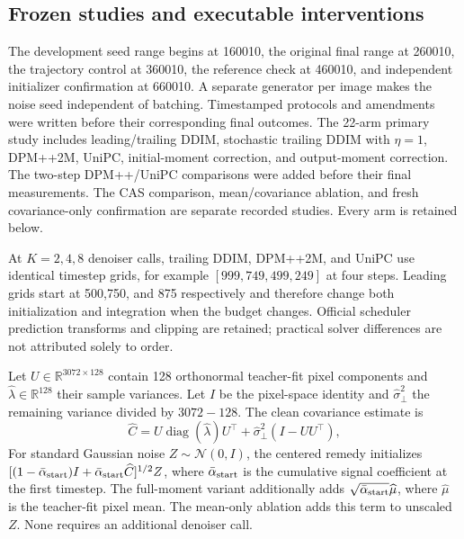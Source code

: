 \subsection{Frozen studies and executable interventions}
The development seed range begins at 160010, the original final range at 260010,
the trajectory control at 360010, the reference check at 460010, and independent
initializer confirmation at 660010. A separate generator per image makes the
noise seed independent of batching. Timestamped protocols and amendments were
written before their corresponding final outcomes. The 22-arm primary study
includes leading/trailing DDIM, stochastic trailing DDIM with $\eta=1$,
DPM++2M, UniPC, initial-moment correction, and output-moment correction.
The two-step DPM++/UniPC comparisons were added before their final measurements.
The CAS comparison, mean/covariance ablation, and fresh covariance-only
confirmation are separate recorded studies. Every arm is retained below.

At $K=2,4,8$ denoiser calls, trailing DDIM, DPM++2M, and UniPC use identical timestep grids,
for example $[999,749,499,249]$ at four steps. Leading grids start at 500,750,
and 875 respectively and therefore change both initialization and integration
when the budget changes. Official scheduler prediction transforms and clipping
are retained; practical solver differences are not attributed solely to order.

Let $U\in\mathbb R^{3072\times128}$ contain 128 orthonormal teacher-fit
pixel components and $\widehat\lambda\in\mathbb R^{128}$ their sample
variances. Let $I$ be the pixel-space identity and
$\widehat\sigma^2_\perp$ the remaining variance divided by $3072-128$.
The clean covariance estimate is
\begin{equation}
\widehat C=U\operatorname{diag}(\widehat\lambda)U^\top
+\widehat\sigma^2_\perp(I-UU^\top),
\label{eq:supp_cifar_covariance}
\end{equation}
For standard Gaussian noise $Z\sim\mathcal N(0,I)$, the centered remedy initializes
$[(1-\bar\alpha_{\rm start})I+\bar\alpha_{\rm start}\widehat C]^{1/2}Z$,
where $\bar\alpha_{\rm start}$ is the cumulative signal coefficient at the first timestep.
The full-moment variant additionally adds
$\sqrt{\bar\alpha_{\rm start}}\widehat\mu$, where $\widehat\mu$ is the
teacher-fit pixel mean. The mean-only ablation adds this term to unscaled
$Z$. None requires an additional denoiser call.


